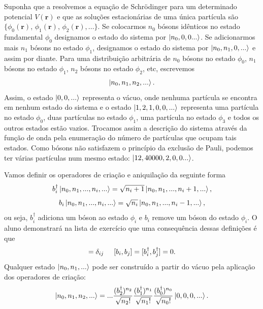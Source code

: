 \documentclass{article}
\begin{document}
Suponha que a resolvemos a equação de Schrödinger para um determinado potencial $V(\mathbf{r})$ e que as soluções estacionárias de uma única partícula são $\{ \phi_0(\mathbf{r})$, $\phi_1(\mathbf{r})$, $\phi_2(\mathbf{r}),...\}$. Se colocarmos $n_0$ bósons idênticos no estado fundamental $\phi_0$ designamos o estado do sistema por $\ket{n_0,0,0...}$. Se adicionarmos mais $n_1$ bósons no estado $\phi_1$, designamos o estado do sistema por $\ket{n_0,n_1,0,...}$ e assim por diante. Para uma distribuição arbitrária de $n_0$ bósons no estado $\phi_0$, $n_1$ bósons no estado $\phi_1$, $n_2$ bósons no estado $\phi_2$, etc, escrevemos
\begin{equation}
    \ket{n_0,n_1,n_2,...}.
\end{equation}
Assim, o estado $\ket{0,0,...}$ representa o vácuo, onde nenhuma partícula se encontra em nenhum estado do sistema e o estado $\ket{1,2,1,0,0,...}$ representa uma partícula no estado $\phi_0$, duas partículas no estado $\phi_1$, uma partícula no estado $\phi_3$ e todos os outros estados estão vazios. Trocamos assim a descrição do sistema através da função de onda pela enumeração do número de partículas que ocupam tais estados. Como bósons não satisfazem o princípio da exclusão de Pauli, podemos ter várias partículas num mesmo estado: $\ket{12,40000,2,0,0...}$.

Vamos definir os operadores de criação e aniquilação da seguinte forma
\begin{equation}
    b_{i}^\dagger \ket{n_0,n_1,...,n_i,...} = \sqrt{n_i + 1}\ket{n_0,n_1,...,n_i+1,...},
\end{equation}
\begin{equation}
    b_{i} \ket{n_0,n_1,...,n_i,...} = \sqrt{n_i}\ket{n_0,n_1,...,n_i-1,...},
\end{equation}
ou seja, $b_i^\dagger$ adiciona um bóson ao estado $\phi_i$ e $b_i$ remove um bóson do estado $\phi_i$. O aluno demonstrará na lista de exercício que uma consequência dessas definições é que
\begin{equation}
    [b_i,b_j^\dagger ] = \delta_{ij} \hspace{0.5cm} [b_i,b_j ] = [b_i^\dagger,b_j^\dagger ] = 0.
\end{equation}
Qualquer estado $\ket{n_0,n_1,...}$ pode ser construído a partir do vácuo pela aplicação dos operadores de criação:
\begin{equation}
    \ket{n_0,n_1,n_2,...} = ... \frac{(b_2^\dagger)^{n_2}}{\sqrt{n_2 !}}\frac{(b_1^\dagger)^{n_1}}{\sqrt{n_1 !}}\frac{(b_0^\dagger)^{n_0}}{\sqrt{n_0 !}}\ket{0,0,0,...}.
\end{equation}
\end{document}

